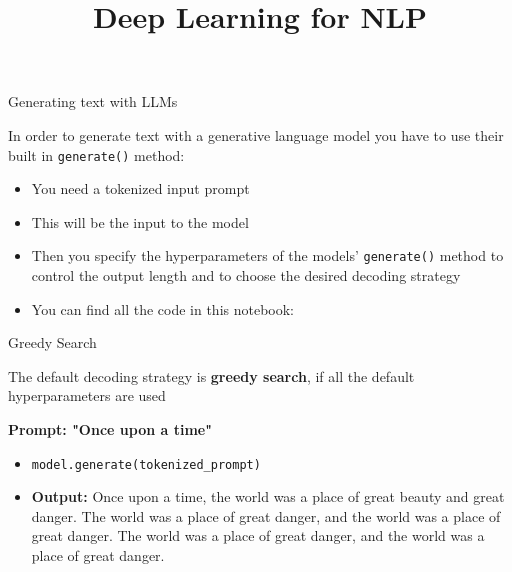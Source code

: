 \documentclass[11pt,compress,t,notes=noshow, xcolor=table]{beamer}
\title{Deep Learning for NLP}
\begin{document}


\begin{frame}{Generating text with LLM\MakeLowercase{s}}

\vfill

In order to generate text with a generative language model you have to use their built in \texttt{generate()} method: 

\vfill

\begin{itemize}
    \item You need a tokenized input prompt
    \item This will be the input to the model 
    \item Then you specify the hyperparameters of the models' \texttt{generate()} method to control the output length and to choose the desired decoding strategy
    \item You can find all the code in this notebook: 
\end{itemize}

\vfill
    
\end{frame}


\begin{vbframe}{Greedy Search}

\vfill

The default decoding strategy is \textbf{greedy search}, if all the default hyperparameters are used

\textbf{Prompt: "Once upon a time"}

\begin{itemize}
    \item \texttt{model.generate(tokenized\_prompt)}
    \item \textbf{Output:} Once upon a time, the world was a place of great beauty and great danger. The world was a place of great danger, and the world was a place of great danger. The world was a place of great danger, and the world was a place of great danger.
\end{itemize}

\vfill
    
\end{vbframe}
\end{document}
